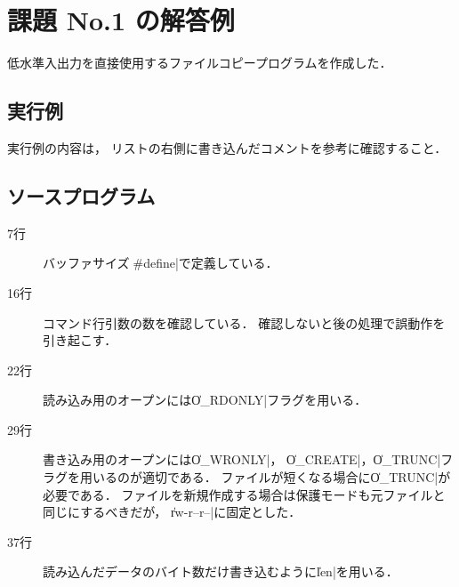 \documentclass[a4j,twcolumn,11pt,nomag]{ltjarticle}      %
\begin{document}
\onecolumn

\section*{課題 No.1 の解答例}
低水準入出力を直接使用するファイルコピープログラムを作成した．

\subsection*{実行例}
実行例の内容は，
リストの右側に書き込んだコメントを参考に確認すること．

\subsection*{ソースプログラム}
\begin{description}
\item[7行] バッファサイズを\|#define|で定義している．
\item[16行] コマンド行引数の数を確認している．
確認しないと後の処理で誤動作を引き起こす．
\item[22行] 読み込み用のオープンには\|O_RDONLY|フラグを用いる．
\item[29行] 書き込み用のオープンには\|O_WRONLY|，
\|O_CREATE|，\|O_TRUNC|フラグを用いるのが適切である．
ファイルが短くなる場合に\|O_TRUNC|が必要である．
ファイルを新規作成する場合は保護モードも元ファイルと同じにするべきだが，
\|rw-r--r--|に固定とした．
\item[37行] 読み込んだデータのバイト数だけ書き込むように\|len|を用いる．
\end{description}

\end{document}

